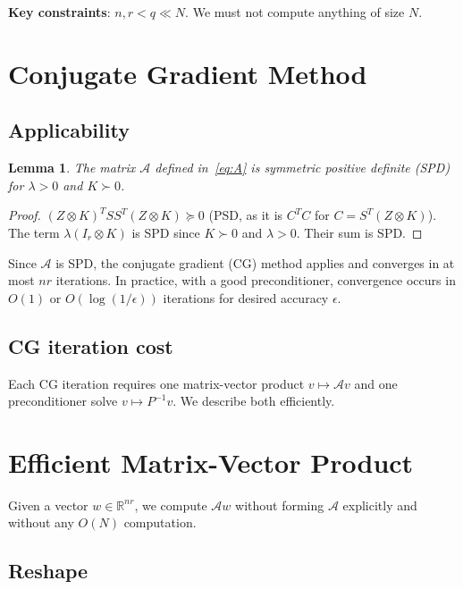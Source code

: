 \documentclass[12pt]{article}
\newtheorem{lemma}[theorem]{Lemma}
\theoremstyle{definition}
\theoremstyle{remark}
\begin{document}
\textbf{Key constraints}: $n,r < q \ll N$. We must not compute anything of
size $N$.

\section{Conjugate Gradient Method}

\subsection{Applicability}

\begin{lemma}
The matrix $\mathcal{A}$ defined in~\eqref{eq:A} is symmetric positive definite
(SPD) for $\lambda > 0$ and $K\succ 0$.
\end{lemma}

\begin{proof}
$(Z\otimes K)^T S S^T (Z\otimes K) \succeq 0$ (PSD, as it is $C^T C$ for
$C = S^T(Z\otimes K)$).  The term $\lambda(I_r\otimes K)$ is SPD since
$K\succ 0$ and $\lambda > 0$.  Their sum is SPD.
\end{proof}

Since $\mathcal{A}$ is SPD, the conjugate gradient (CG) method applies and
converges in at most $nr$ iterations.  In practice, with a good preconditioner,
convergence occurs in $O(1)$ or $O(\log(1/\epsilon))$ iterations for desired
accuracy $\epsilon$.

\subsection{CG iteration cost}

Each CG iteration requires one matrix-vector product $v\mapsto\mathcal{A}v$
and one preconditioner solve $v\mapsto P^{-1}v$.  We describe both efficiently.

\section{Efficient Matrix-Vector Product}

Given a vector $w\in\mathbb{R}^{nr}$, we compute $\mathcal{A}w$ without forming
$\mathcal{A}$ explicitly and without any $O(N)$ computation.

\subsection{Reshape}
\end{document}
